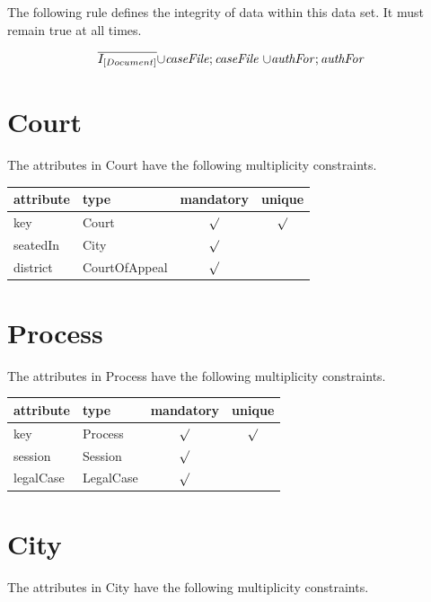 \documentclass[10pt,a4paper]{report}              %
\theoremstyle{plain}\theorembodyfont{\rmfamily}\newtheorem{definition}{Definition}[section]
\theoremstyle{plain}\theorembodyfont{\rmfamily}\newtheorem{designrule}[definition]{Requirement}
\def\id#1{\mbox{\em #1\/}}
\newcommand{\cmpl}[1]{\overline{#1}}
\begin{document}
The following rule defines the integrity of data within this data set. It must remain true at all times. 

\[\cmpl{I_{[Document]}}{\cup}{\id{caseFile}};{\id{caseFile}}~{\cup}{\id{authFor}};{\id{authFor}}~\]

\section{Court}

\label{sct:plug Court}

The attributes in Court have the following multiplicity constraints. 

\begin{center}
\begin{tabular}{llcc}
attribute & type & mandatory & unique\\
\hline
key  & Court & $\surd$ & $\surd$\\
seatedIn & City & $\surd$ & \\
district & CourtOfAppeal & $\surd$ & \\
\end{tabular}
\end{center}

\section{Process}

\label{sct:plug Process}

The attributes in Process have the following multiplicity constraints. 

\begin{center}
\begin{tabular}{llcc}
attribute & type & mandatory & unique\\
\hline
key  & Process & $\surd$ & $\surd$\\
session & Session & $\surd$ & \\
legalCase & LegalCase & $\surd$ & \\
\end{tabular}
\end{center}

\section{City}

\label{sct:plug City}

The attributes in City have the following multiplicity constraints. 
\end{document}
